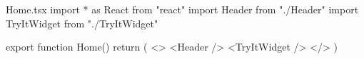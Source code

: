 {Home.tsx}
import * as React from "react"
import { Header } from "./Header"
import { TryItWidget } from "./TryItWidget"

export function Home() {
  return (
    <>
      <Header />
      <TryItWidget />
    </>
  )
}
